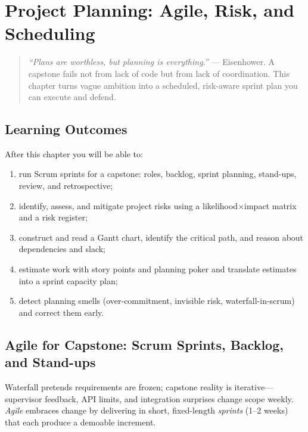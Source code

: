 \chapter{Project Planning: Agile, Risk, and Scheduling}
\label{ch:planning}

\begin{quote}
\emph{``Plans are worthless, but planning is everything.''} --- Eisenhower. A capstone fails not from lack of code but from lack of coordination. This chapter turns vague ambition into a scheduled, risk-aware sprint plan you can execute and defend.
\end{quote}

\noindent{}
\vspace{0.4em}

\section*{Learning Outcomes}
After this chapter you will be able to:
\begin{enumerate}[label=(L\arabic*)]
    \item run Scrum sprints for a capstone: roles, backlog, sprint planning, stand-ups, review, and retrospective;
    \item identify, assess, and mitigate project risks using a likelihood$\times$impact matrix and a risk register;
    \item construct and read a Gantt chart, identify the critical path, and reason about dependencies and slack;
    \item estimate work with story points and planning poker and translate estimates into a sprint capacity plan;
    \item detect planning smells (over-commitment, invisible risk, waterfall-in-scrum) and correct them early.
\end{enumerate}

\section{Agile for Capstone: Scrum Sprints, Backlog, and Stand-ups}
\label{sec:agile-capstone}
Waterfall pretends requirements are frozen; capstone reality is iterative---supervisor feedback, API limits, and integration surprises change scope weekly. \emph{Agile} embraces change by delivering in short, fixed-length \emph{sprints} (1--2 weeks) that each produce a demoable increment.

